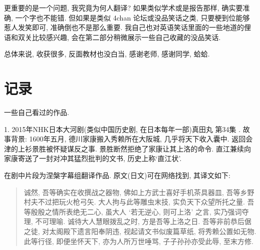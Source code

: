 \documentclass[a4paper, 12pt, UTF8]{article}
\begin{document}
更重要的是一个问题, 我究竟为何人翻译? 如果类似学术或是报告那样, 确实要准确, 一个字也不能错. 但如果是类似 4chan 论坛或没品笑话之类, 只要梗到位能够惹人发笑即可, 准确倒也不是那么重要. 我自己也对英语笑话里面的一些地道的俚语和双关比较感兴趣, 会在第二部分稍微展示一些自己收藏的没品笑话.

总体来说, 收获很多, 反面教材也没白当, 感谢老师, 感谢同学, 蛤蛤.

\section{记录}
一些自己看过的作品.

1. 2015年NHK日本大河剧(类似中国历史剧, 在日本每年一部)真田丸 第34集
. 故事背景: 1600年五月, 德川家康搬入秀赖所在大阪城, 几乎将天下收入囊中. 返回会津的上衫景胜被怀疑谋反之事. 景胜断然拒绝了家康让其上洛的命令. 直江兼续向家康寄送了一封对冲其猛烈批判的文书, 历史上称`直江状'. 

在剧中片段为涅槃字幕组翻译作品. 原文(日文)可在网络找到, 其译文如下: 

\begin{quote}
    诚然, 吾等确实在收撰战之器物, 佛如上方武士喜好手机茶具器皿, 吾等乡野村夫不过把玩火枪弓矢. 大人拘与此等雕虫末技, 实负天下众望所托之量. 吾等殷殷之情所表绝无二心, 虽大人 `若无逆心, 则可上洛' 之言, 实乃强词夺理, 不可理喻. 诚待大人慧眼拨乱之时, 方是吾等上洛之日. 吾等非前恭后倨之徒, 对太阁殿下遗言阳奉阴违, 视起请文书似废篇草纸, 将秀赖公置如无物. 此等行径, 即便坐怀天下, 亦为人所万世唾骂, 子子孙孙亦受此辱, 至末方修.
\end{quote}
\end{document}
